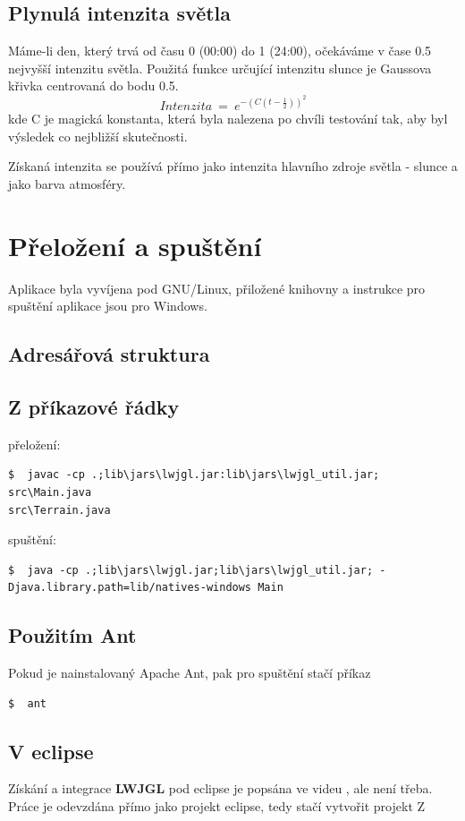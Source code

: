 \documentclass[11pt]{article}
\begin{document}
\subsection{Plynulá intenzita světla}
Máme-li den, který trvá od času 0 (00:00) do 1 (24:00), očekáváme v čase 0.5
nejvyšší intenzitu světla. Použitá funkce určující intenzitu slunce je Gaussova
křivka centrovaná do bodu 0.5.
$$
Intenzita~=~e^{- (C(t - \frac{1}{2}))^2}
$$
kde C je magická konstanta, která byla nalezena po chvíli testování tak, aby
byl výsledek co nejbližší skutečnosti.

Získaná intenzita se používá přímo jako intenzita hlavního zdroje světla - slunce a jako barva atmosféry.

\section{Přeložení a spuštění}
Aplikace byla vyvíjena pod GNU/Linux, přiložené knihovny a instrukce pro spuštění aplikace jsou pro Windows.

\subsection{Adresářová struktura}
\subsection{Z příkazové řádky}
přeložení:
\begin{verbatim}
$  javac -cp .;lib\jars\lwjgl.jar:lib\jars\lwjgl_util.jar; src\Main.java
src\Terrain.java
\end{verbatim}
spuštění:
\begin{verbatim}
$  java -cp .;lib\jars\lwjgl.jar;lib\jars\lwjgl_util.jar; -Djava.library.path=lib/natives-windows Main
\end{verbatim}
\subsection{Použitím Ant}
Pokud je nainstalovaný Apache Ant, pak pro spuštění stačí příkaz
\begin{verbatim}
$  ant
\end{verbatim}
\subsection{V eclipse}
Získání a integrace \textbf {LWJGL} pod eclipse je popsána ve videu
\cite{installtut}, ale není třeba. Práce je odevzdána přímo jako projekt
eclipse, tedy stačí vytvořit projekt Z
\end{document}
